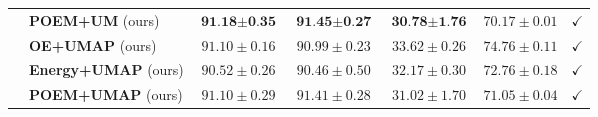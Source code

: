 \documentclass{article}
\theoremstyle{plain}
\theoremstyle{definition}
\theoremstyle{remark}
\begin{document}
\begin{table}[h!]
{\begin{tabular}{c|l|ccccc}
         & \textbf{POEM+UM} (ours) & $\textbf{91.18}\pm\textbf{0.35}$ & $\textbf{91.45}\pm\textbf{0.27}$ & $\textbf{30.78}\pm\textbf{1.76}$ & $70.17\pm0.01$ & $\checkmark$\\
         & \textbf{OE+UMAP} (ours) & $91.10\pm0.16$ & $90.99\pm0.23$ & $33.62\pm0.26$ & $74.76\pm0.11$ & $\checkmark$\\
         & \textbf{Energy+UMAP} (ours) & $90.52\pm0.26$ & $90.46\pm0.50$ & $32.17\pm0.30$ & $72.76\pm0.18$ & $\checkmark$\\
         & \textbf{POEM+UMAP} (ours) & $91.10\pm0.29$ & $91.41\pm0.28$ & $31.02\pm1.70$ & $71.05\pm0.04$ & $\checkmark$\\
        \bottomrule[1.5pt]
    \end{tabular}}
    \label{tab:my_label_complete}
\end{table}
\end{document}
